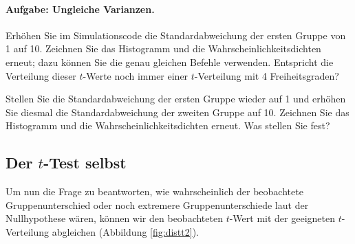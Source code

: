 \documentclass[oneside, 10pt]{book}\usepackage[]{graphicx}\usepackage[]{xcolor}
\begin{document}
\paragraph{Aufgabe: Ungleiche Varianzen.}
Erhöhen Sie im Simulationscode die Standardabweichung der ersten Gruppe
von 1 auf 10. Zeichnen Sie das Histogramm und die Wahrscheinlichkeitsdichten
erneut; dazu können Sie die genau gleichen Befehle verwenden. Entspricht
die Verteilung dieser $t$-Werte noch immer einer $t$-Verteilung mit 4 Freiheitsgraden?

Stellen Sie die Standardabweichung der ersten Gruppe wieder auf 1 und erhöhen
Sie diesmal die Standardabweichung der zweiten Gruppe auf 10.
Zeichnen Sie das Histogramm und die Wahrscheinlichkeitsdichten
erneut. Was stellen Sie fest?

\subsection{Der $t$-Test selbst}
Um nun die Frage zu beantworten, wie wahrscheinlich der beobachtete
Gruppenunterschied oder noch extremere Gruppenunterschiede laut der
Nullhypothese wären, können wir den beobachteten $t$-Wert mit
der geeigneten $t$-Verteilung abgleichen (Abbildung \ref{fig:distt2}).
\end{document}
